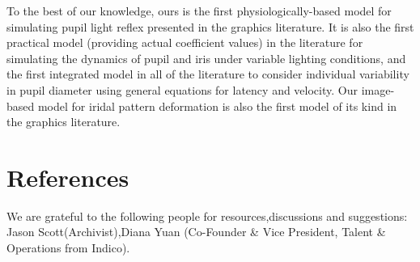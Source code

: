 \documentclass{acmtog} %
\begin{document}
To the best of our knowledge, ours is the first physiologically-based
model for simulating pupil light reflex presented in the graphics
literature. It is also the first practical model (providing actual
coefficient values) in the literature for simulating the dynamics of
pupil and iris under variable lighting conditions, and the first
integrated model in all of the literature to consider individual
variability in pupil diameter using general equations for latency and
velocity. Our image-based model for iridal pattern deformation is also
the first model of its kind in the graphics literature.\vskip21pt

\section{References}

\begin{acks}
We are grateful to the following people for resources,discussions and suggestions: Jason Scott(Archivist),Diana Yuan (Co-Founder & Vice President, Talent & Operations from Indico).
\end{acks}





\end{document}
